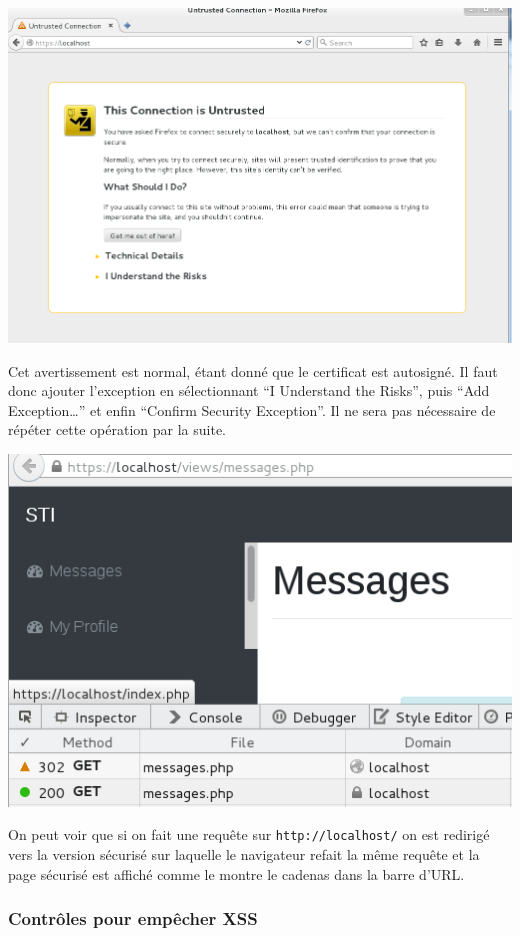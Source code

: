 \documentclass{article}
\begin{document}
\includegraphics[width=\textwidth]{images/ssl.PNG}

Cet avertissement est normal, étant donné que le certificat est
autosigné. Il faut donc ajouter l'exception en sélectionnant ``I
Understand the Risks'', puis ``Add Exception\ldots{}'' et enfin
``Confirm Security Exception''. Il ne sera pas nécessaire de répéter
cette opération par la suite.

\includegraphics[width=\textwidth]{images/ssl1.png}

On peut voir que si on fait une requête sur \texttt{http://localhost/}
on est redirigé vers la version sécurisé sur laquelle le navigateur
refait la même requête et la page sécurisé est affiché comme le montre
le cadenas dans la barre d'URL.

\subsubsection{Contrôles pour empêcher XSS}
\end{document}
